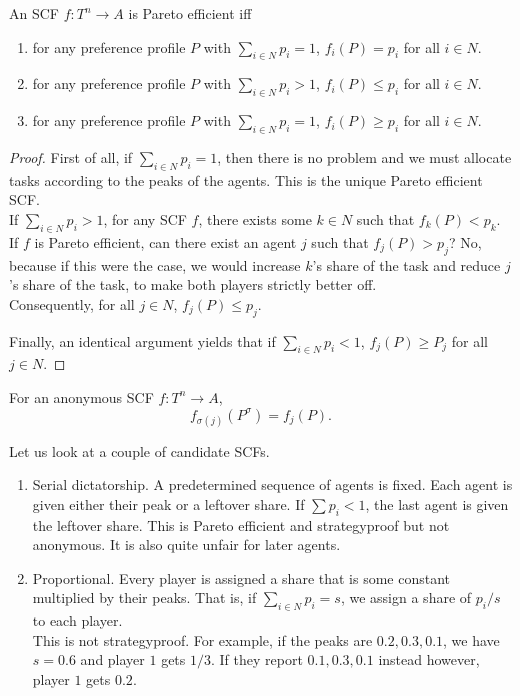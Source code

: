 		\begin{flem}
			\label{lem: task allocation pe}
			An SCF $f : T^n \to A$ is Pareto efficient iff
			\begin{enumerate}
				\item for any preference profile $P$ with $\sum_{i \in N} p_i = 1$, $f_i(P) = p_i$ for all $i \in N$.
				\item for any preference profile $P$ with $\sum_{i \in N} p_i > 1$, $f_i(P) \le p_i$ for all $i \in N$.
				\item for any preference profile $P$ with $\sum_{i \in N} p_i = 1$, $f_i(P) \ge p_i$ for all $i \in N$.
			\end{enumerate}
		\end{flem}
		\begin{proof}
			First of all, if $\sum_{i \in N} p_i = 1$, then there is no problem and we must allocate tasks according to the peaks of the agents. This is the unique Pareto efficient SCF.\\

			If $\sum_{i \in N} p_i > 1$, for any SCF $f$, there exists some $k \in N$ such that $f_k(P) < p_k$.\\
			If $f$ is Pareto efficient, can there exist an agent $j$ such that $f_j(P) > p_j$? No, because if this were the case, we would increase $k$'s share of the task and reduce $j$'s share of the task, to make both players strictly better off.\\
			Consequently, for all $j \in N$, $f_j(P) \le p_j$.

			Finally, an identical argument yields that if $\sum_{i \in N} p_i < 1$, $f_j(P) \ge P_j$ for all $j \in N$.
		\end{proof}


		\begin{fdef}[Anonymity]
			For an anonymous SCF $f : T^n \to A$,
			\[ f_{\sigma(j)}(P^\sigma) = f_j(P). \]
		\end{fdef}

		Let us look at a couple of candidate SCFs.
		\begin{enumerate}
			\item Serial dictatorship. A predetermined sequence of agents is fixed. Each agent is given either their peak or a leftover share. If $\sum p_i < 1$, the last agent is given the leftover share. This is Pareto efficient and strategyproof but not anonymous. It is also quite unfair for later agents.
			\item Proportional. Every player is assigned a share that is some constant multiplied by their peaks. That is, if $\sum_{i \in N} p_i = s$, we assign a share of $p_i/s$ to each player.\\
			This is not strategyproof. For example, if the peaks are $0.2,0.3,0.1$, we have $s = 0.6$ and player $1$ gets $1/3$. If they report $0.1,0.3,0.1$ instead however, player $1$ gets $0.2$.
		\end{enumerate}

